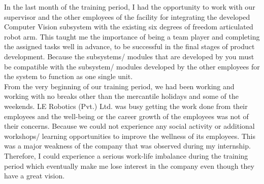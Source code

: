 \documentclass[a4paper,12pt]{report}
\begin{document}
In the last month of the training period, I had the opportunity to work with our supervisor and the other employees of the facility for integrating the developed Computer Vision subsystem with the existing six degrees of freedom articulated robot arm. This taught me the importance of being a team player and completing the assigned tasks well in advance, to be successful in the final stages of product development. Because the subsystems/ modules that are developed by you must be compatible with the subsystem/ modules developed by the other employees for the system to function as one single unit.\\

From the very beginning of our training period, we had been working and working with no breaks other than the mercantile holidays and some of the weekends. LE Robotics (Pvt.) Ltd. was busy getting the work done from their employees and the well-being or the career growth of the employees was not of their concerns. Because we could not experience any social activity or additional workshops/ learning opportunities to improve the wellness of its employees. This was a major weakness of the company that was observed during my internship. Therefore, I could experience a serious work-life imbalance during the training period which eventually make me lose interest in the company even though they have a great vision. 
\end{document}
